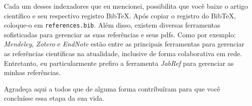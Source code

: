 \documentclass[portuguese,noindentfirst]{UASTeX} %
\begin{document}
Cada um desses indexadores que eu mencionei, possibilita que você baixe o artigo científico e seu respectivo registro Bib\TeX. Após copiar o registro do Bib\TeX, coloque-o em {\tt references.bib}. Além disso, existem diversas ferramentas sofisticadas para gerenciar as suas referências e seus pdfs. Como por exemplo: \emph{Mendeley}, \emph{Zotero} e \emph{EndNote} estão entre as principais ferramentas para gerenciar as referências científicas na atualidade, inclusive de forma colaborativa em rede. Entretanto, eu particularmente prefiro a ferramenta \emph{JabRef} para gerenciar as minhas referências.

\begin{acknowledgements} %
Agradeça aqui a todos que de alguma forma contribuíram para que você concluísse essa etapa da sua vida.
\end{acknowledgements}



	
\end{document}
